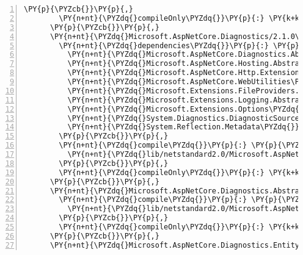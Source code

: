 \begin{Verbatim}[commandchars=\\\{\},numbers=left,firstnumber=1,stepnumber=1,numberblanklines=0]
        \PY{p}{\PYZcb{}}\PY{p}{,}
        \PY{n+nt}{\PYZdq{}compileOnly\PYZdq{}}\PY{p}{:} \PY{k+kc}{true}
      \PY{p}{\PYZcb{}}\PY{p}{,}
      \PY{n+nt}{\PYZdq{}Microsoft.AspNetCore.Diagnostics/2.1.0\PYZhy{}rc1\PYZhy{}final\PYZdq{}}\PY{p}{:} \PY{p}{\PYZob{}}
        \PY{n+nt}{\PYZdq{}dependencies\PYZdq{}}\PY{p}{:} \PY{p}{\PYZob{}}
          \PY{n+nt}{\PYZdq{}Microsoft.AspNetCore.Diagnostics.Abstractions\PYZdq{}}\PY{p}{:} \PY{l+s+s2}{\PYZdq{}2.1.0\PYZhy{}rc1\PYZhy{}final\PYZdq{}}\PY{p}{,}
          \PY{n+nt}{\PYZdq{}Microsoft.AspNetCore.Hosting.Abstractions\PYZdq{}}\PY{p}{:} \PY{l+s+s2}{\PYZdq{}2.1.0\PYZhy{}rc1\PYZhy{}final\PYZdq{}}\PY{p}{,}
          \PY{n+nt}{\PYZdq{}Microsoft.AspNetCore.Http.Extensions\PYZdq{}}\PY{p}{:} \PY{l+s+s2}{\PYZdq{}2.1.0\PYZhy{}rc1\PYZhy{}final\PYZdq{}}\PY{p}{,}
          \PY{n+nt}{\PYZdq{}Microsoft.AspNetCore.WebUtilities\PYZdq{}}\PY{p}{:} \PY{l+s+s2}{\PYZdq{}2.1.0\PYZhy{}rc1\PYZhy{}final\PYZdq{}}\PY{p}{,}
          \PY{n+nt}{\PYZdq{}Microsoft.Extensions.FileProviders.Physical\PYZdq{}}\PY{p}{:} \PY{l+s+s2}{\PYZdq{}2.1.0\PYZhy{}rc1\PYZhy{}final\PYZdq{}}\PY{p}{,}
          \PY{n+nt}{\PYZdq{}Microsoft.Extensions.Logging.Abstractions\PYZdq{}}\PY{p}{:} \PY{l+s+s2}{\PYZdq{}2.1.0\PYZhy{}rc1\PYZhy{}final\PYZdq{}}\PY{p}{,}
          \PY{n+nt}{\PYZdq{}Microsoft.Extensions.Options\PYZdq{}}\PY{p}{:} \PY{l+s+s2}{\PYZdq{}2.1.0\PYZhy{}rc1\PYZhy{}final\PYZdq{}}\PY{p}{,}
          \PY{n+nt}{\PYZdq{}System.Diagnostics.DiagnosticSource\PYZdq{}}\PY{p}{:} \PY{l+s+s2}{\PYZdq{}4.5.0\PYZhy{}rc1\PYZdq{}}\PY{p}{,}
          \PY{n+nt}{\PYZdq{}System.Reflection.Metadata\PYZdq{}}\PY{p}{:} \PY{l+s+s2}{\PYZdq{}1.6.0\PYZhy{}rc1\PYZdq{}}
        \PY{p}{\PYZcb{}}\PY{p}{,}
        \PY{n+nt}{\PYZdq{}compile\PYZdq{}}\PY{p}{:} \PY{p}{\PYZob{}}
          \PY{n+nt}{\PYZdq{}lib/netstandard2.0/Microsoft.AspNetCore.Diagnostics.dll\PYZdq{}}\PY{p}{:} \PY{p}{\PYZob{}}\PY{p}{\PYZcb{}}
        \PY{p}{\PYZcb{}}\PY{p}{,}
        \PY{n+nt}{\PYZdq{}compileOnly\PYZdq{}}\PY{p}{:} \PY{k+kc}{true}
      \PY{p}{\PYZcb{}}\PY{p}{,}
      \PY{n+nt}{\PYZdq{}Microsoft.AspNetCore.Diagnostics.Abstractions/2.1.0\PYZhy{}rc1\PYZhy{}final\PYZdq{}}\PY{p}{:} \PY{p}{\PYZob{}}
        \PY{n+nt}{\PYZdq{}compile\PYZdq{}}\PY{p}{:} \PY{p}{\PYZob{}}
          \PY{n+nt}{\PYZdq{}lib/netstandard2.0/Microsoft.AspNetCore.Diagnostics.Abstractions.dll\PYZdq{}}\PY{p}{:} \PY{p}{\PYZob{}}\PY{p}{\PYZcb{}}
        \PY{p}{\PYZcb{}}\PY{p}{,}
        \PY{n+nt}{\PYZdq{}compileOnly\PYZdq{}}\PY{p}{:} \PY{k+kc}{true}
      \PY{p}{\PYZcb{}}\PY{p}{,}
      \PY{n+nt}{\PYZdq{}Microsoft.AspNetCore.Diagnostics.EntityFrameworkCore/2.1.0\PYZhy{}rc1\PYZhy{}final\PYZdq{}}\PY{p}{:} \PY{p}{\PYZob{}}

\end{Verbatim}
